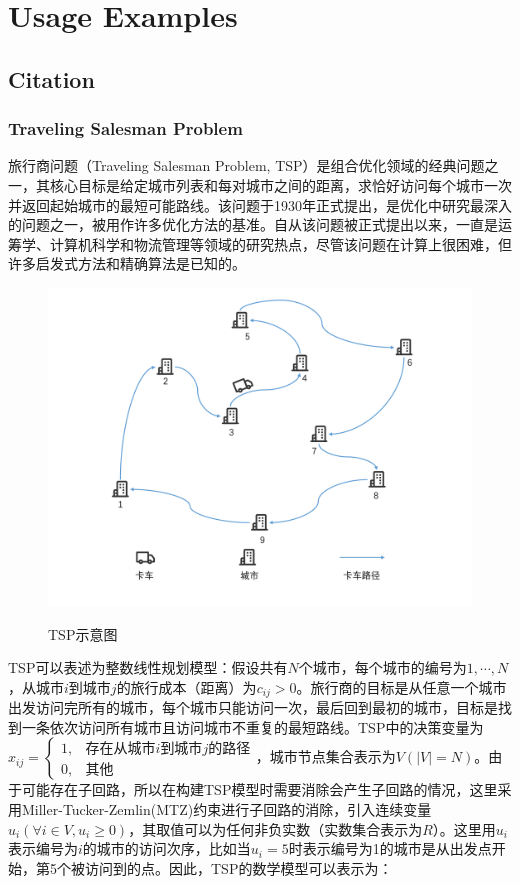 \part{Usage Examples}

\chapter{Citation}

\section{Traveling Salesman Problem}
旅行商问题（Traveling Salesman Problem, TSP）是组合优化领域的经典问题之一，其核心目标是给定城市列表和每对城市之间的距离，求恰好访问每个城市一次并返回起始城市的最短可能路线。该问题于1930年正式提出，是优化中研究最深入的问题之一，被用作许多优化方法的基准。自从该问题被正式提出以来，一直是运筹学、计算机科学和物流管理等领域的研究热点，尽管该问题在计算上很困难，但许多启发式方法和精确算法是已知的\cite{2009A, 2012Models}。

\begin{figure}[!htb]
    \centering
    \includegraphics[width=\linewidth]{images/TSP.pdf}\\
    \caption{TSP示意图}
\end{figure}

TSP可以表述为整数线性规划模型\cite{papadimitriou1998combinatorial}：假设共有$N$个城市，每个城市的编号为$1,\cdots,N$，从城市$i$到城市$j$的旅行成本（距离）为$c_{ij}>0$。旅行商的目标是从任意一个城市出发访问完所有的城市，每个城市只能访问一次，最后回到最初的城市，目标是找到一条依次访问所有城市且访问城市不重复的最短路线。TSP中的决策变量为$x_{ij}=\begin{cases}1, & \text{存在从城市$i$到城市$j$的路径}\\0, & \text{其他} \end{cases}$，城市节点集合表示为$V(|V| = N)$。由于可能存在子回路，所以在构建TSP模型时需要消除会产生子回路的情况，这里采用Miller-Tucker-Zemlin(MTZ)约束进行子回路的消除\cite{1960Integer}，引入连续变量$u_i(\forall i \in V, u_i \geq 0)$，其取值可以为任何非负实数（实数集合表示为$R$）。这里用$u_i$表示编号为$i$的城市的访问次序，比如当$u_i = 5$时表示编号为1的城市是从出发点开始，第5个被访问到的点。因此，TSP的数学模型可以表示为：


